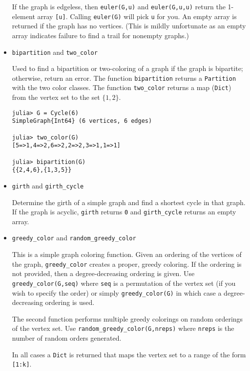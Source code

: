 \documentclass[oneside]{amsart}
\begin{document}
\begin{itemize}
  If the graph is edgeless, then \verb|euler(G,u)| and
  \verb|euler(G,u,u)| return the 1-element array \verb|[u]|. Calling
  \verb|euler(G)| will pick \verb|u| for you.  An empty array is
  returned if the graph has no vertices. (This is mildly unfortunate
  as an empty array indicates failure to find a trail for nonempty
  graphs.)

\item \verb|bipartition| and \verb|two_color|

  Used to find a bipartition or two-coloring of a graph if the graph
  is bipartite; otherwise, return an error. The function
  \verb|bipartition| returns a \verb|Partition| with the two
  color classes.
  The function
  \verb|two_color| returns a map (\verb|Dict|) from the vertex set to
  the set $\{1,2\}$.
  {\small
\begin{verbatim}
julia> G = Cycle(6)
SimpleGraph{Int64} (6 vertices, 6 edges)

julia> two_color(G)
[5=>1,4=>2,6=>2,2=>2,3=>1,1=>1]

julia> bipartition(G)
{{2,4,6},{1,3,5}}
\end{verbatim}
  }


\item \verb|girth| and \verb|girth_cycle|

  Determine the girth of a simple graph and find a shortest cycle
  in that graph. If the graph is acyclic, \verb|girth| returns
  \verb|0| and \verb|girth_cycle| returns an empty array.


\item \verb|greedy_color| and \verb|random_greedy_color|

  This is a simple graph coloring function. Given an ordering of the
  vertices of the graph, \verb|greedy_color| creates a proper, greedy
  coloring. If the ordering is not provided, then a degree-decreasing
  ordering is given. Use \verb|greedy_color(G,seq)| where \verb|seq|
  is a permutation of the vertex set (if you wish to specify the
  order) or simply \verb|greedy_color(G)| in which case a
  degree-decreasing ordering is used.

  The second function performs multiple greedy colorings on random
  orderings of the vertex set. Use \verb|random_greedy_color(G,nreps)|
  where \verb|nreps| is the number of random orders generated.

  In all cases a \verb|Dict| is returned that maps the vertex set to a
  range of the form \verb|[1:k]|.



\end{itemize}
\end{document}
